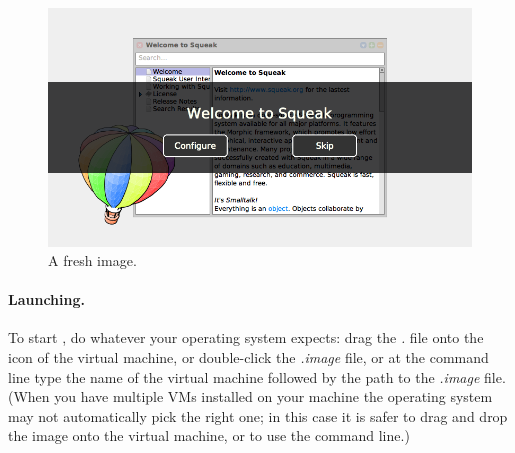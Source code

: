 \documentclass[a4paper,10pt,twoside]{book}
\begin{document}

\begin{figure}[htb]
\centerline {\includegraphics[width=\textwidth]{startup}}
\caption{A fresh \sbe image.\label{fig:startup}}
\end{figure}

\paragraph{Launching.} To start \sq, do whatever your operating system expects: drag the \emph{.} file onto the icon of the virtual machine, or double-click the \emph{.image} file, or  at the command line type the name of the virtual machine followed by the path to the \emph{.image} file. (When you have multiple VMs installed on your machine the operating system may not automatically pick the right one; in this case it is safer to drag and drop the image onto the virtual machine, or to use the command line.)
\end{document}
